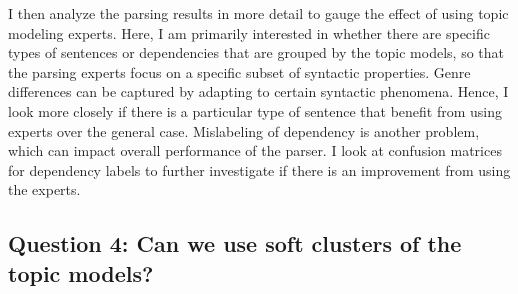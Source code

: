 I then analyze the parsing results in more detail to gauge the effect of using topic modeling experts. Here, I am primarily interested in whether there are specific types of sentences or dependencies that are grouped by the topic models, so that the parsing experts focus on a specific subset of syntactic properties. Genre differences can be captured by adapting to certain syntactic phenomena. Hence, I look more closely if there is a particular type of sentence that benefit from using experts over the general case. Mislabeling of dependency is another problem, which can impact overall performance of the parser. I look at confusion matrices for dependency labels to further investigate if there is an improvement from using the experts.


\subsection{Question 4: Can we use soft clusters of the topic models?}




